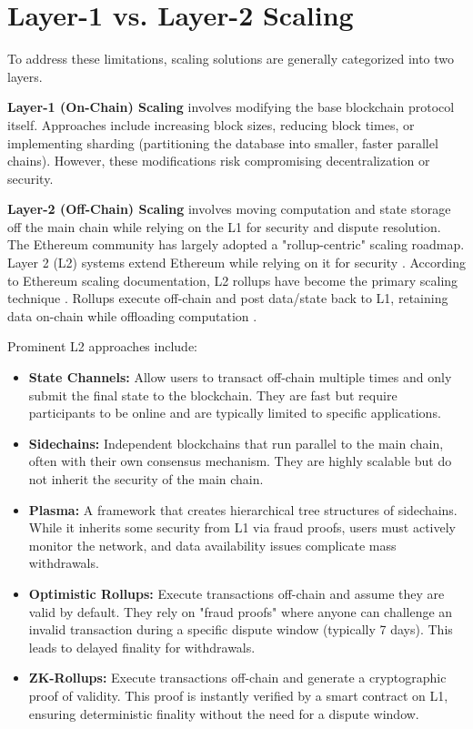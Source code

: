 \section{Layer-1 vs. Layer-2 Scaling}
\label{sec:layer1_vs_layer2}

To address these limitations, scaling solutions are generally categorized into two layers.

\textbf{Layer-1 (On-Chain) Scaling} involves modifying the base blockchain protocol itself. Approaches include increasing block sizes, reducing block times, or implementing sharding (partitioning the database into smaller, faster parallel chains). However, these modifications risk compromising decentralization or security.

\textbf{Layer-2 (Off-Chain) Scaling} involves moving computation and state storage off the main chain while relying on the L1 for security and dispute resolution. The Ethereum community has largely adopted a "rollup-centric" scaling roadmap. Layer 2 (L2) systems extend Ethereum while relying on it for security \citep{ethdocs_layer2}. According to Ethereum scaling documentation, L2 rollups have become the primary scaling technique \citep{ethdocs_scaling}. Rollups execute off-chain and post data/state back to L1, retaining data on-chain while offloading computation \citep{chaliasos2024analyzing}.

Prominent L2 approaches include:
\begin{itemize}
    \item \textbf{State Channels:} Allow users to transact off-chain multiple times and only submit the final state to the blockchain. They are fast but require participants to be online and are typically limited to specific applications.
    \item \textbf{Sidechains:} Independent blockchains that run parallel to the main chain, often with their own consensus mechanism. They are highly scalable but do not inherit the security of the main chain.
    \item \textbf{Plasma:} A framework that creates hierarchical tree structures of sidechains. While it inherits some security from L1 via fraud proofs, users must actively monitor the network, and data availability issues complicate mass withdrawals.
    \item \textbf{Optimistic Rollups:} Execute transactions off-chain and assume they are valid by default. They rely on "fraud proofs" where anyone can challenge an invalid transaction during a specific dispute window (typically 7 days). This leads to delayed finality for withdrawals.
    \item \textbf{ZK-Rollups:} Execute transactions off-chain and generate a cryptographic proof of validity. This proof is instantly verified by a smart contract on L1, ensuring deterministic finality without the need for a dispute window.
\end{itemize}
